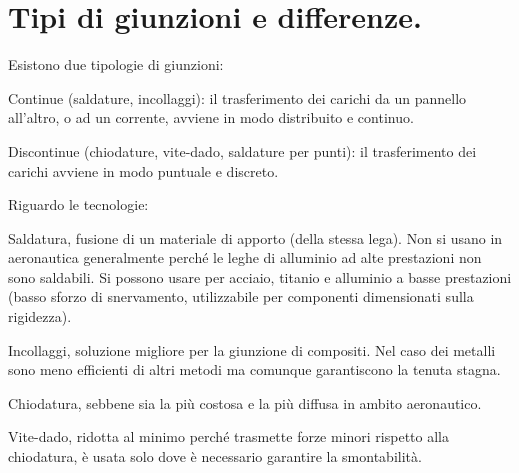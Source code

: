 \section{Tipi di giunzioni e differenze.}


Esistono due tipologie di giunzioni:
\begin{compactitem}
    \item Continue (saldature, incollaggi): il trasferimento dei carichi da un pannello all'altro, o ad un corrente, avviene in modo distribuito e continuo.\\
    \item Discontinue (chiodature, vite-dado, saldature per punti): il trasferimento dei carichi avviene in modo puntuale e discreto.
\end{compactitem}

Riguardo le tecnologie:
\begin{compactitem}
    \item Saldatura, fusione di un materiale di apporto (della stessa lega). Non si usano in aeronautica generalmente perché le leghe di alluminio ad alte prestazioni non sono saldabili. Si possono usare per acciaio, titanio e alluminio a basse prestazioni (basso sforzo di snervamento, utilizzabile per componenti dimensionati sulla rigidezza).\\
    \item Incollaggi, soluzione migliore per la giunzione di compositi. Nel caso dei metalli sono meno efficienti di altri metodi ma comunque garantiscono la tenuta stagna.\\
    \item Chiodatura, sebbene sia la più costosa e la più diffusa in ambito aeronautico.\\
    \item Vite-dado, ridotta al minimo perché trasmette forze minori rispetto alla chiodatura, è usata solo  dove è necessario garantire la smontabilità.
\end{compactitem}

